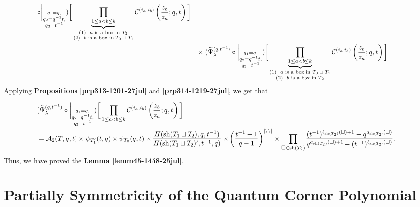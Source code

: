 \documentclass[12pt,reqno,a4paper]{amsart}
\newcommand{\comp}{\circ}
\newcommand{\cals}[1]{\mathcal{#1}}
\numberwithin{equation}{section}
\theoremstyle{definition}
\begin{document}
\begin{align}
	\comp 
	\bigg|_{
		\substack{
			q_1 = q, \\
			q_2 = q^{-1}t,\\
			q_3 = t^{-1} \\
		}
	}
	)
	\bigg[
	\underbrace{	\prod_{1 \leq a < b \leq k}				}_{
		\substack{
			(1) \,\, \text{ $a$ is a box in $T_2$}
			\\
			(2) \,\, \text{ $b$ is a box in $T_0 \sqcup T_1$}
		}
	}
	\cals{C}^{(i_a,i_b)}\left(
	\frac{z_b}{z_a}
	; q, t
	\right)
	\bigg]
	\notag 
	\\
	&\hspace{0.3cm}\times
	(
	\widetilde{\Psi}_{\lambda}^{(q,t^{-1})}
	\comp 
	\bigg|_{
		\substack{
			q_1 = q, \\
			q_2 = q^{-1}t,\\
			q_3 = t^{-1} \\
		}
	}
	)
	\bigg[
	\underbrace{	\prod_{1 \leq a < b \leq k}				}_{
		\substack{
			(1) \,\, \text{ $a$ is a box in $T_0 \sqcup T_1$}
			\\
			(2) \,\, \text{ $b$ is a box in $T_2$}
		}
	}
	\cals{C}^{(i_a,i_b)}\left(
	\frac{z_b}{z_a}
	; q, t
	\right)
	\bigg]
	\notag 
\end{align}
\normalsize
Applying \textbf{Propositions \ref{prp313-1201-27jul}} and \textbf{\ref{prp314-1219-27jul}}, we get that 

\footnotesize
\begin{align}
	&(
	\widetilde{\Psi}_{\lambda}^{(q,t^{-1})}
	\comp 
	\bigg|_{
		\substack{
			q_1 = q, \\
			q_2 = q^{-1}t,\\
			q_3 = t^{-1} \\
		}
	}
	)
	\bigg[
	\prod_{1 \leq a < b \leq k}
	\cals{C}^{(i_a,i_b)}\left(
	\frac{z_b}{z_a}
	; q, t
	\right)
	\bigg]
	\\
	&=  
	\cals{A}_2(T;q,t) \times 
	\psi_{T^{\prime}_{1}}(t,q) \times \psi_{T_0}(q,t)
	\times
	\frac{
		H(\operatorname{sh}(T_1 \sqcup T_2),q,t^{-1})
	}{
		H(\operatorname{sh}(T_1 \sqcup T_2)^\prime,t^{-1},q)
	}
	\times
	\left(	\frac{t^{-1} - 1}{q-1}		\right)^{|T_1|}
	\notag
	\times 
	\prod_{\square \in \operatorname{sh}(T_2)}
	\frac{
		(t^{-1})^{\ell_{\operatorname{sh}(T_2)}(\square) + 1} - q^{a_{\operatorname{sh}(T_2)}(\square)}
	}{
		q^{a_{\operatorname{sh}(T_2)}(\square) + 1} - (t^{-1})^{\ell_{\operatorname{sh}(T_2)}(\square)}
	}. 
	\notag 
\end{align}
\normalsize
Thus, we have proved the \textbf{Lemma \ref{lemm45-1458-25jul}}. 

\section{Partially Symmetricity of the Quantum Corner Polynomial}
\label{sec5-0016-7aug}
\end{document}

